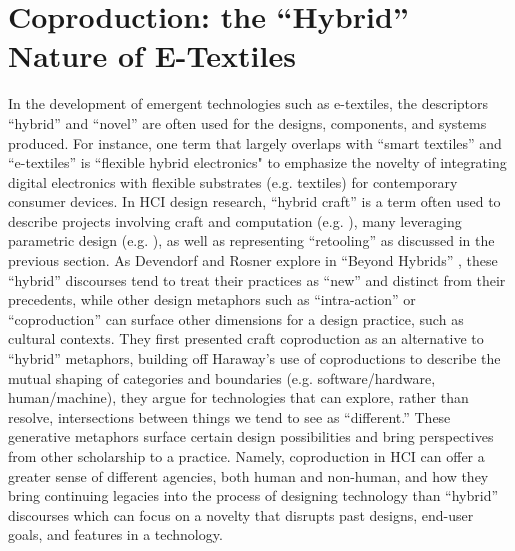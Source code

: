 

\section{Coproduction: the ``Hybrid'' Nature of E-Textiles}

In the development of emergent technologies such as e-textiles, the descriptors ``hybrid'' and ``novel'' are often used for the designs, components, and systems produced. For instance, one term that largely overlaps with ``smart textiles'' and ``e-textiles'' is ``flexible hybrid electronics" \cite{schwartz_flexible_2017} to emphasize the novelty of integrating digital electronics with flexible substrates (e.g. textiles) for contemporary consumer devices. In HCI design research, ``hybrid craft'' is a term often used to describe projects involving craft and computation (e.g. \cite{buechley_crafting_2012,liu_decomposition_2019,tsaknaki_articulating_2017}), many leveraging parametric design (e.g. \cite{magrisso_digital_2018,efrat_hybrid_2016}), as well as representing ``retooling'' as discussed in the previous section. As Devendorf and Rosner explore in ``Beyond Hybrids'' \cite{devendorf_beyond_2017}, these ``hybrid'' discourses tend to treat their practices as ``new'' and distinct from their precedents, while other design metaphors such as ``intra-action'' or ``coproduction'' can surface other dimensions for a design practice, such as cultural contexts. They first presented craft coproduction as an alternative to ``hybrid'' metaphors, building off Haraway's use of coproductions to describe the mutual shaping of categories and boundaries (e.g. software/hardware, human/machine), they argue for technologies that can explore, rather than resolve, intersections between things we tend to see as ``different.'' These generative metaphors surface certain design possibilities and bring perspectives from other scholarship to a practice. Namely, coproduction in HCI can offer a greater sense of different agencies, both human and non-human, and how they bring continuing legacies into the process of designing technology than ``hybrid'' discourses which can focus on a novelty that disrupts past designs, end-user goals, and features in a technology.

